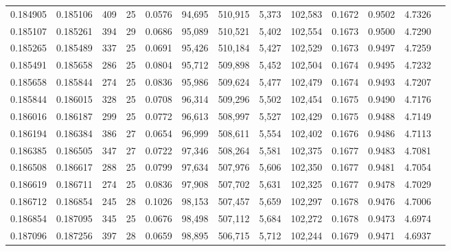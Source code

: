 \begin{tabular}{rrrrrrrrrrrrr}
0.184905 & 0.185106 &   409 &  25 &                                     0.0576 &  94,695 & 510,915 &   5,373 & 102,583 & 0.1672 & 0.9502 & 4.7326 \\
0.185107 & 0.185261 &   394 &  29 &                                     0.0686 &  95,089 & 510,521 &   5,402 & 102,554 & 0.1673 & 0.9500 & 4.7290 \\
0.185265 & 0.185489 &   337 &  25 &                                     0.0691 &  95,426 & 510,184 &   5,427 & 102,529 & 0.1673 & 0.9497 & 4.7259 \\
0.185491 & 0.185658 &   286 &  25 &                                     0.0804 &  95,712 & 509,898 &   5,452 & 102,504 & 0.1674 & 0.9495 & 4.7232 \\
0.185658 & 0.185844 &   274 &  25 &                                     0.0836 &  95,986 & 509,624 &   5,477 & 102,479 & 0.1674 & 0.9493 & 4.7207 \\
0.185844 & 0.186015 &   328 &  25 &                                     0.0708 &  96,314 & 509,296 &   5,502 & 102,454 & 0.1675 & 0.9490 & 4.7176 \\
0.186016 & 0.186187 &   299 &  25 &                                     0.0772 &  96,613 & 508,997 &   5,527 & 102,429 & 0.1675 & 0.9488 & 4.7149 \\
0.186194 & 0.186384 &   386 &  27 &                                     0.0654 &  96,999 & 508,611 &   5,554 & 102,402 & 0.1676 & 0.9486 & 4.7113 \\
0.186385 & 0.186505 &   347 &  27 &                                     0.0722 &  97,346 & 508,264 &   5,581 & 102,375 & 0.1677 & 0.9483 & 4.7081 \\
0.186508 & 0.186617 &   288 &  25 &                                     0.0799 &  97,634 & 507,976 &   5,606 & 102,350 & 0.1677 & 0.9481 & 4.7054 \\
0.186619 & 0.186711 &   274 &  25 &                                     0.0836 &  97,908 & 507,702 &   5,631 & 102,325 & 0.1677 & 0.9478 & 4.7029 \\
0.186712 & 0.186854 &   245 &  28 &                                     0.1026 &  98,153 & 507,457 &   5,659 & 102,297 & 0.1678 & 0.9476 & 4.7006 \\
0.186854 & 0.187095 &   345 &  25 &                                     0.0676 &  98,498 & 507,112 &   5,684 & 102,272 & 0.1678 & 0.9473 & 4.6974 \\
0.187096 & 0.187256 &   397 &  28 &                                     0.0659 &  98,895 & 506,715 &   5,712 & 102,244 & 0.1679 & 0.9471 & 4.6937 \\

\end{tabular}

